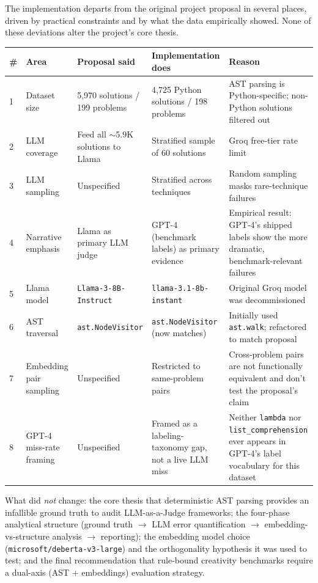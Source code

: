\documentclass{article}
\begin{document}
The implementation departs from the original project proposal in several
places, driven by practical constraints and by what the data empirically
showed. None of these deviations alter the project's core thesis.

\begin{center}
\small
\begin{tabular}{p{0.4cm}p{2.3cm}p{3.2cm}p{3.2cm}p{2.9cm}}
\toprule
\textbf{\#} & \textbf{Area} & \textbf{Proposal said} & \textbf{Implementation does} & \textbf{Reason} \\
\midrule
1 & Dataset size & 5{,}970 solutions / 199 problems & 4{,}725 Python solutions / 198 problems & AST parsing is Python-specific; non-Python solutions filtered out \\
2 & LLM coverage & Feed all $\sim$5.9K solutions to Llama & Stratified sample of 60 solutions & Groq free-tier rate limit \\
3 & LLM sampling & Unspecified & Stratified across techniques & Random sampling masks rare-technique failures \\
4 & Narrative emphasis & Llama as primary LLM judge & GPT-4 (benchmark labels) as primary evidence & Empirical result: GPT-4's shipped labels show the more dramatic, benchmark-relevant failures \\
5 & Llama model & \texttt{Llama-3-8B-Instruct} & \texttt{llama-3.1-8b-instant} & Original Groq model was decommissioned \\
6 & AST traversal & \texttt{ast.NodeVisitor} & \texttt{ast.NodeVisitor} (now matches) & Initially used \texttt{ast.walk}; refactored to match proposal \\
7 & Embedding pair sampling & Unspecified & Restricted to same-problem pairs & Cross-problem pairs are not functionally equivalent and don't test the proposal's claim \\
8 & GPT-4 miss-rate framing & Unspecified & Framed as a labeling-taxonomy gap, not a live LLM miss & Neither \texttt{lambda} nor \texttt{list\_comprehension} ever appears in GPT-4's label vocabulary for this dataset \\
\bottomrule
\end{tabular}
\end{center}

What did \emph{not} change: the core thesis that deterministic AST parsing
provides an infallible ground truth to audit LLM-as-a-Judge frameworks; the
four-phase analytical structure (ground truth $\rightarrow$ LLM error
quantification $\rightarrow$ embedding-vs-structure analysis $\rightarrow$
reporting); the embedding model choice (\texttt{microsoft/deberta-v3-large})
and the orthogonality hypothesis it was used to test; and the final
recommendation that rule-bound creativity benchmarks require a dual-axis
(AST + embeddings) evaluation strategy.
\end{document}
